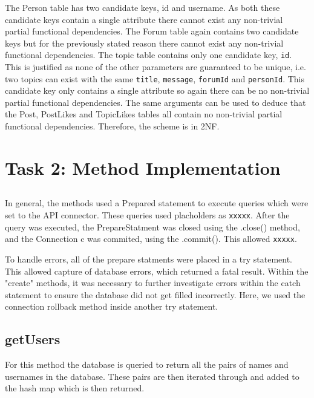 \documentclass{article}
\begin{document}
The Person table has two candidate keys, id and username. As both these candidate keys contain a single attribute there cannot exist any non-trivial partial functional dependencies. The Forum table again contains two candidate keys but for the previously stated reason there cannot exist any non-trivial functional dependencies. The topic table contains only one candidate key, \texttt{id}. This is justified as none of the other parameters are guaranteed to be unique, i.e. two topics can exist with the same \texttt{title}, \texttt{message}, \texttt{forumId} and \texttt{personId}. This candidate key only contains a single attribute so again there can be no non-trivial partial functional dependencies. The same arguments can be used to deduce that the Post, PostLikes and TopicLikes tables all contain no non-trivial partial functional dependencies. Therefore, the scheme is in 2NF.



\newpage
\section*{Task 2: Method Implementation}

\subsection*{}

In general, the methods used a Prepared statement to execute queries which were set to the API connector. These queries used placholders as \texttt{xxxxx}. After the query was executed, the PrepareStatment was closed using the .close() method, and the Connection c was commited, using the .commit(). This allowed \texttt{xxxxx}.

To handle errors, all of the prepare statments were placed in a try statement. This allowed capture of database errors, which returned a fatal result. Within the "create" methods, it was necessary to further investigate errors within the catch statement to ensure the database did not get filled incorrectly. Here, we used the connection rollback method inside another try statement.

\subsection*{getUsers}

For this method the database is queried to return all the pairs of names and usernames in the database. These pairs are then iterated through and added to the hash map which is then returned.
\end{document}
